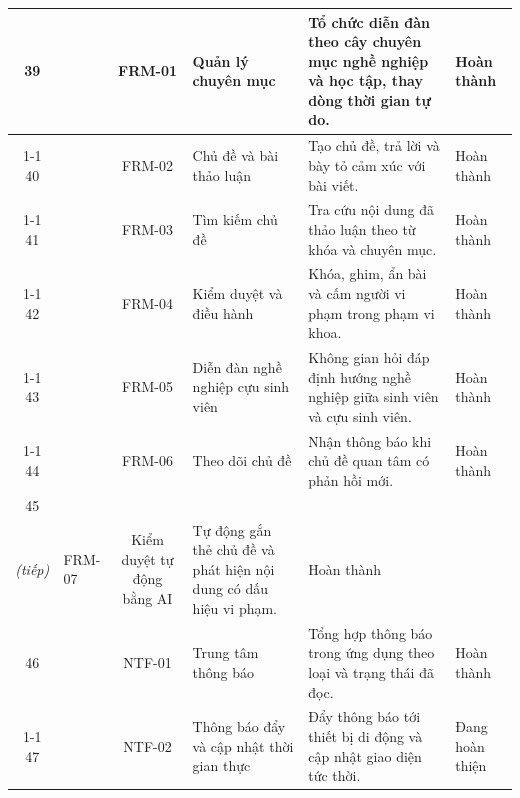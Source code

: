\documentclass[12pt,a4paper,oneside]{report}
\begin{document}
\begin{longtable}{|c|>{\raggedright\arraybackslash}p{2.5cm}|c|>{\raggedright\arraybackslash}p{3.1cm}|>{\raggedright\arraybackslash}p{5.0cm}|>{\raggedright\arraybackslash}p{1.9cm}|}
\hline
\cellcolor{oldrow}39 & \cellcolor{oldrow} & \cellcolor{oldrow}FRM-01 & \cellcolor{oldrow}Quản lý chuyên mục & \cellcolor{oldrow}Tổ chức diễn đàn theo cây chuyên mục nghề nghiệp và học tập, thay dòng thời gian tự do. & \cellcolor{oldrow}Hoàn thành \\
\cline{1-1}\cline{3-6}
\cellcolor{oldrow}40 & \cellcolor{oldrow} & \cellcolor{oldrow}FRM-02 & \cellcolor{oldrow}Chủ đề và bài thảo luận & \cellcolor{oldrow}Tạo chủ đề, trả lời và bày tỏ cảm xúc với bài viết. & \cellcolor{oldrow}Hoàn thành \\
\cline{1-1}\cline{3-6}
\cellcolor{oldrow}41 & \cellcolor{oldrow} & \cellcolor{oldrow}FRM-03 & \cellcolor{oldrow}Tìm kiếm chủ đề & \cellcolor{oldrow}Tra cứu nội dung đã thảo luận theo từ khóa và chuyên mục. & \cellcolor{oldrow}Hoàn thành \\
\cline{1-1}\cline{3-6}
\cellcolor{oldrow}42 & \cellcolor{oldrow} & \cellcolor{oldrow}FRM-04 & \cellcolor{oldrow}Kiểm duyệt và điều hành & \cellcolor{oldrow}Khóa, ghim, ẩn bài và cấm người vi phạm trong phạm vi khoa. & \cellcolor{oldrow}Hoàn thành \\
\cline{1-1}\cline{3-6}
\cellcolor{oldrow}43 & \cellcolor{oldrow} & \cellcolor{oldrow}FRM-05 & \cellcolor{oldrow}Diễn đàn nghề nghiệp cựu sinh viên & \cellcolor{oldrow}Không gian hỏi đáp định hướng nghề nghiệp giữa sinh viên và cựu sinh viên. & \cellcolor{oldrow}Hoàn thành \\
\cline{1-1}\cline{3-6}
\cellcolor{oldrow}44 & \multirow{-6}{2.4cm}{\cellcolor{oldrow}\textbf{Diễn đàn}} & \cellcolor{oldrow}FRM-06 & \cellcolor{oldrow}Theo dõi chủ đề & \cellcolor{oldrow}Nhận thông báo khi chủ đề quan tâm có phản hồi mới. & \cellcolor{oldrow}Hoàn thành \\
\hline
\cellcolor{oldrow}45 & \multirow{-1}{2.4cm}{\cellcolor{oldrow}\textbf{Diễn đàn\\\textit{(tiếp)}}} & \cellcolor{oldrow}FRM-07 & \cellcolor{oldrow}Kiểm duyệt tự động bằng AI & \cellcolor{oldrow}Tự động gắn thẻ chủ đề và phát hiện nội dung có dấu hiệu vi phạm. & \cellcolor{oldrow}Hoàn thành \\
\hline
\cellcolor{oldrow}46 & \cellcolor{oldrow} & \cellcolor{oldrow}NTF-01 & \cellcolor{oldrow}Trung tâm thông báo & \cellcolor{oldrow}Tổng hợp thông báo trong ứng dụng theo loại và trạng thái đã đọc. & \cellcolor{oldrow}Hoàn thành \\
\cline{1-1}\cline{3-6}
\cellcolor{oldrow}47 & \cellcolor{oldrow} & \cellcolor{oldrow}NTF-02 & \cellcolor{oldrow}Thông báo đẩy và cập nhật thời gian thực & \cellcolor{oldrow}Đẩy thông báo tới thiết bị di động và cập nhật giao diện tức thời. & \cellcolor{oldrow}Đang hoàn thiện \\

\end{longtable}
\end{document}
